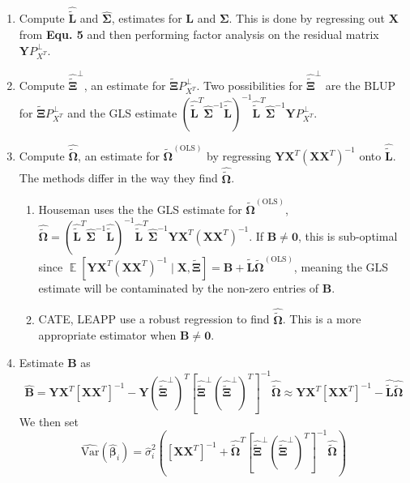 \documentclass{article}
\DeclareMathOperator{\E}{\mathbb{E}}
\begin{document}
\begin{enumerate}
	\item Compute $\hat{\bm{\tilde{L}}}$ and $\hat{\bm{\Sigma}}$, estimates for $\bm{L}$ and $\bm{\Sigma}$. This is done by regressing out $\bm{X}$ from \textbf{Equ. 5} and then performing factor analysis on the residual matrix $\bm{Y}P_{X^T}^{\perp}$.
	\item Compute $\hat{\tilde{\bm{\Xi}}}^{\perp}$, an estimate for $\tilde{\bm{\Xi}} P_{X^T}^{\perp}$. Two possibilities for $\hat{\tilde{\bm{\Xi}}}^{\perp}$ are the BLUP for $\tilde{\bm{\Xi}} P_{X^T}^{\perp}$ and the GLS estimate $\left( \hat{\bm{\tilde{L}}}^T \hat{\bm{\Sigma}}^{-1}\hat{\bm{\tilde{L}}} \right)^{-1} \hat{\bm{\tilde{L}}}^T \hat{\bm{\Sigma}}^{-1} \bm{Y} P_{X^T}^{\perp}$.	
	\item Compute $\hat{\tilde{\bm{\Omega}}}$, an estimate for $\tilde{\bm{\Omega}}^{(\text{OLS})}$ by regressing $\bm{Y} \bm{X}^T \left( \bm{X}\bm{X}^T \right)^{-1}$ onto $\hat{\bm{\tilde{L}}}$. The methods differ in the way they find $\hat{\tilde{\bm{\Omega}}}$.
		\begin{enumerate}
		\item Houseman uses the the GLS estimate for $\tilde{\bm{\Omega}}^{(\text{OLS})}$, $\hat{\tilde{\bm{\Omega}}} = \left( \hat{\bm{\tilde{L}}}^T \hat{\bm{\Sigma}}^{-1}\hat{\bm{\tilde{L}}} \right)^{-1} \hat{\bm{\tilde{L}}}^T \hat{\bm{\Sigma}}^{-1} \bm{Y} \bm{X}^T \left( \bm{X}\bm{X}^T \right)^{-1}$. If $\bm{B} \neq \bm{0}$, this is sub-optimal since $\E\left[ \bm{Y}\bm{X}^T \left( \bm{X}\bm{X}^T \right)^{-1} \mid \bm{X}, \tilde{\bm{\Xi}} \right] = \bm{B} + \bm{\tilde{L}}\tilde{\bm{\Omega}}^{(\text{OLS})}$, meaning the GLS estimate will be contaminated by the non-zero entries of $\bm{B}$.
		\item CATE, LEAPP use a robust regression to find $\hat{\tilde{\bm{\Omega}}}$. This is a more appropriate estimator when $\bm{B} \neq \bm{0}$. 
		\end{enumerate}
	\item Estimate $\bm{B}$ as
	\begin{equation}
	\hat{\bm{B}} = \bm{Y} \bm{X}^T \left[ \bm{X}\bm{X}^T \right]^{-1} - \bm{Y} \left( \hat{\tilde{\bm{\Xi}}}^{\perp} \right)^T \left[ \hat{\tilde{\bm{\Xi}}}^{\perp} \left( \hat{\tilde{\bm{\Xi}}}^{\perp} \right)^T \right]^{-1} \hat{\tilde{\bm{\Omega}}} \approx \bm{Y} \bm{X}^T \left[ \bm{X}\bm{X}^T \right]^{-1} - \hat{\tilde{\bm{L}}} \hat{\tilde{\bm{\Omega}}}
	\end{equation}
	We then set 
\begin{equation}
\hat{\text{Var}}\left( \hat{\bm{\beta}}_i \right) = \hat{\sigma}_i^2 \left( \left[ \bm{X}\bm{X}^T \right]^{-1} + \hat{\tilde{\bm{\Omega}}}^T\left[ \hat{\tilde{\bm{\Xi}}}^{\perp}\left( \hat{\tilde{\bm{\Xi}}}^{\perp} \right)^T \right]^{-1} \hat{\tilde{\bm{\Omega}}} \right)
\end{equation} 
\end{enumerate}
\end{document}
